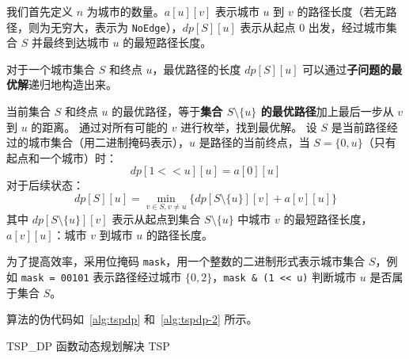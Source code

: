 我们首先定义 $n$ 为城市的数量。$a[u][v]$ 表示城市 $u$ 到 $v$ 的路径长度（若无路径，则为无穷大，表示为 \texttt{NoEdge}），$dp[S][u]$ 表示从起点 $0$ 出发，经过城市集合 $S$ 并最终到达城市 $u$ 的最短路径长度。

对于一个城市集合 $S$ 和终点 $u$，最优路径的长度 $dp[S][u]$ 可以通过\textbf{子问题的最优解}递归地构造出来。

当前集合 $S$ 和终点 $u$ 的最优路径，等于\textbf{集合 $S \setminus \{u\}$ 的最优路径}加上最后一步从 $v$ 到 $u$ 的距离。  
通过对所有可能的 $v$ 进行枚举，找到最优解。
设 $S$ 是当前路径经过的城市集合（用二进制掩码表示），$u$ 是路径的当前终点，当 $S = \{0, u\}$（只有起点和一个城市）时：
\[
dp[1 << u][u] = a[0][u]
\]
对于后续状态：
\[
dp[S][u] = \min_{v \in S, v \neq u} \{ dp[S \setminus \{u\}][v] + a[v][u] \}
\]
其中 $dp[S \setminus \{u\}][v]$ 表示从起点到集合 $S \setminus \{u\}$ 中城市 $v$ 的最短路径长度，$a[v][u]$：城市 $v$ 到城市 $u$ 的路径长度。

为了提高效率，采用位掩码 \texttt{mask}，用一个整数的二进制形式表示城市集合 $S$，例如 \texttt{mask = 00101} 表示路径经过城市 $\{0, 2\}$，\texttt{mask \& (1 << u)} 判断城市 $u$ 是否属于集合 $S$。

算法的伪代码如~\autoref{alg:tspdp} 和~\autoref{alg:tspdp-2} 所示。

\begin{algorithm}[htbp]
    \SetAlgoLined
    
    \caption{TSP\_DP 函数动态规划解决 TSP}
    \label{alg:tspdp}
    
    \end{algorithm}

